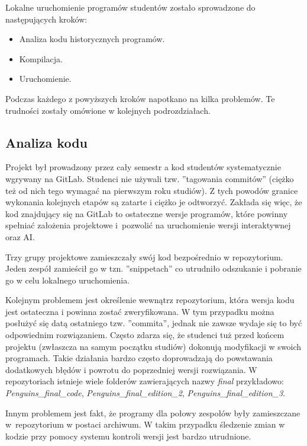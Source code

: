 Lokalne uruchomienie programów studentów zostało sprowadzone do następujących kroków:
\begin{itemize}
    \item Analiza kodu historycznych programów.
    \item Kompilacja.
    \item Uruchomienie.
\end{itemize}

Podczas każdego z powyższych kroków napotkano na kilka problemów.
Te trudności zostały omówione w kolejnych podrozdziałach.

\subsection{Analiza kodu}

Projekt był prowadzony przez cały semestr a kod studentów systematycznie wgrywany na GitLab.
Studenci nie używali tzw. ”tagowania commitów” (ciężko też od nich tego wymagać na pierwszym roku studiów).
Z tych powodów granice wykonania kolejnych etapów są zatarte i ciężko je odtworzyć.
Zakłada się więc, że kod znajdujący się na GitLab to ostateczne wersje programów, które powinny spełniać założenia projektowe i~pozwolić na uruchomienie wersji interaktywnej oraz AI.

Trzy grupy projektowe zamieszczały swój kod bezpośrednio w repozytorium.
Jeden zespół zamieścił go w tzn. ”snippetach” co utrudniło odszukanie i pobranie go w celu lokalnego uruchomienia.

Kolejnym problemem jest określenie wewnątrz repozytorium, która wersja kodu jest ostateczna i powinna zostać zweryfikowana.
W tym przypadku można posłużyć się datą ostatniego tzw. ”commita”, jednak nie zawsze wydaje się to być odpowiednim rozwiązaniem.
Często zdarza się, że studenci tuż przed końcem projektu (zwłaszcza na samym początku studiów) dokonują modyfikacji w swoich programach.
Takie działania bardzo często doprowadzają do powstawania dodatkowych błędów i powrotu do poprzedniej wersji rozwiązania.
W repozytoriach istnieje wiele folderów zawierających nazwy \textit{final} przykładowo: \textit{Penguins\_final\_code}, \textit{Penguins\_final\_edition\_2}, \textit{Penguins\_final\_edition\_3}.

Innym problemem jest fakt, że programy dla połowy zespołów były zamieszczane w~repozytorium w postaci archiwum.
W takim przypadku śledzenie zmian w kodzie przy pomocy systemu kontroli wersji jest bardzo utrudnione.

